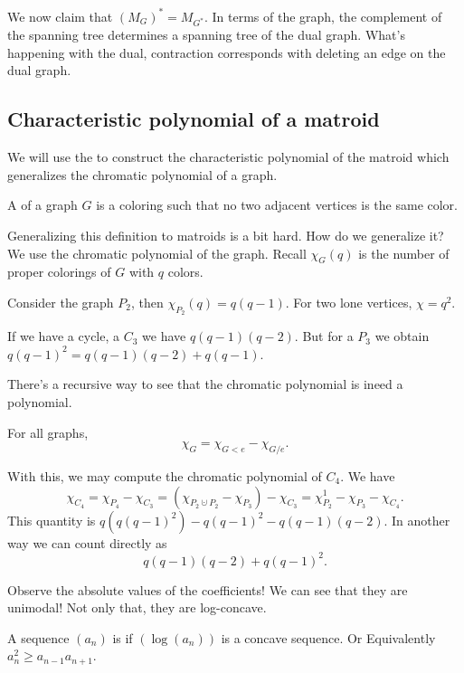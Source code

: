 \documentclass[12pt]{memoir}
\begin{document}
We now claim that $(M_G)^\ast=M_{G^\ast}$. In terms of the graph, the complement of the spanning tree determines a spanning tree of the dual graph. What's happening with the dual, contraction corresponds with deleting an edge on the dual graph.

\subsection{Characteristic polynomial of a matroid}

We will use the to construct the characteristic polynomial of the matroid which generalizes the chromatic polynomial of a graph.

\begin{Def}
A  of a graph $G$ is a coloring such that no two adjacent vertices is the same color. 
\end{Def}

Generalizing this definition to matroids is a bit hard. How do we generalize it? We use the chromatic polynomial of the graph. Recall $\chi_G(q)$ is the number of proper colorings of $G$ with $q$ colors.

\begin{Ex}
    Consider the graph $P_2$, then $\chi_{P_2}(q)=q(q-1)$. For two lone vertices, $\chi=q^2$.\par 
    If we have a cycle, a $C_3$ we have $q(q-1)(q-2)$. But for a $P_3$ we obtain $q(q-1)^2=q(q-1)(q-2)+q(q-1)$.
\end{Ex}

There's a recursive way to see that the chromatic polynomial is ineed a polynomial.

\begin{Prop}
For all graphs, 
$$\chi_G=\chi_{G\less e}-\chi_{G/e}.$$
\end{Prop}

\begin{Ex}
    With this, we may compute the chromatic polynomial of $C_4$. We have 
    $$\chi_{C_4}=\chi_{P_4}-\chi_{C_3}=(\chi_{P_2\cupdot P_2}-\chi_{P_3})-\chi_{C_3}=\chi_{P_2}^1-\chi_{P_3}-\chi_{C_4}.$$
    This quantity is $q(q(q-1)^2)-q(q-1)^2-q(q-1)(q-2)$.
    In another way we can count directly as 
    $$q(q-1)(q-2)+q(q-1)^2.$$
\end{Ex}

Observe the absolute values of the coefficients! We can see that they are unimodal! Not only that, they are log-concave.

\begin{Def}
    A sequence $(a_n)$ is  if $(\log(a_n))$ is a concave sequence. Or Equivalently $a_n^2\geq a_{n-1}a_{n+1}$.
\end{Def}
\end{document}
